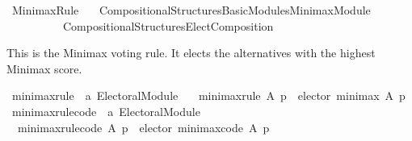 %
\begin{isabellebody}%
%
%
\isadelimdocument
\isanewline
%
\endisadelimdocument
%
\isatagdocument
\isanewline
%
\isamarkuptrue%
%
\endisatagdocument
{\isafolddocument}%
%
\isadelimdocument
%
\endisadelimdocument
%
\isadelimtheory
%
\endisadelimtheory
%
\isatagtheory
{}\isamarkupfalse%
\ Minimax{\isacharunderscore}{\kern0pt}Rule\isanewline
\ \ \ {\isachardoublequoteopen}Compositional{\isacharunderscore}{\kern0pt}Structures{\isacharslash}{\kern0pt}Basic{\isacharunderscore}{\kern0pt}Modules{\isacharslash}{\kern0pt}Minimax{\isacharunderscore}{\kern0pt}Module{\isachardoublequoteclose}\isanewline
\ \ \ \ \ \ \ \ \ \ {\isachardoublequoteopen}Compositional{\isacharunderscore}{\kern0pt}Structures{\isacharslash}{\kern0pt}Elect{\isacharunderscore}{\kern0pt}Composition{\isachardoublequoteclose}\isanewline
{}%
\endisatagtheory
{\isafoldtheory}%
%
\isadelimtheory
%
\endisadelimtheory
%
\begin{isamarkuptext}%
This is the Minimax voting rule. It elects the alternatives with the highest
Minimax score.%
\end{isamarkuptext}\isamarkuptrue%
%
\isadelimdocument
%
\endisadelimdocument
%
\isatagdocument
%
\isamarkuptrue%
%
\endisatagdocument
{\isafolddocument}%
%
\isadelimdocument
%
\endisadelimdocument
{}\isamarkupfalse%
\ minimax{\isacharunderscore}{\kern0pt}rule\ {\isacharcolon}{\kern0pt}{\isacharcolon}{\kern0pt}\ {\isachardoublequoteopen}{\isacharprime}{\kern0pt}a\ Electoral{\isacharunderscore}{\kern0pt}Module{\isachardoublequoteclose}\ \isanewline
\ \ {\isachardoublequoteopen}minimax{\isacharunderscore}{\kern0pt}rule\ A\ p\ {\isacharequal}{\kern0pt}\ elector\ minimax\ A\ p{\isachardoublequoteclose}\isanewline
\isanewline
{}\isamarkupfalse%
\ minimax{\isacharunderscore}{\kern0pt}rule{\isacharunderscore}{\kern0pt}code\ {\isacharcolon}{\kern0pt}{\isacharcolon}{\kern0pt}\ {\isachardoublequoteopen}{\isacharprime}{\kern0pt}a\ Electoral{\isacharunderscore}{\kern0pt}Module{\isachardoublequoteclose}\ \isanewline
\ \ {\isachardoublequoteopen}minimax{\isacharunderscore}{\kern0pt}rule{\isacharunderscore}{\kern0pt}code\ A\ p\ {\isacharequal}{\kern0pt}\ elector\ minimax{\isacharunderscore}{\kern0pt}code\ A\ p{\isachardoublequoteclose}%
\isadelimdocument
%
\endisadelimdocument
%
\isatagdocument
%
\end{isabellebody}
